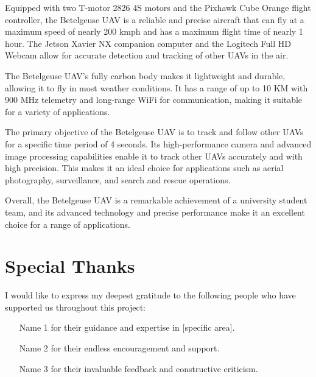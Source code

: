 \documentclass{article}
\begin{document}
Equipped with two T-motor 2826 4S motors and the Pixhawk Cube Orange flight controller, the Betelgeuse UAV is a reliable and precise aircraft that can fly at a maximum speed of nearly 200 kmph and has a maximum flight time of nearly 1 hour. The Jetson Xavier NX companion computer and the Logitech Full HD Webcam allow for accurate detection and tracking of other UAVs in the air.

The Betelgeuse UAV's fully carbon body makes it lightweight and durable, allowing it to fly in most weather conditions. It has a range of up to 10 KM with 900 MHz telemetry and long-range WiFi for communication, making it suitable for a variety of applications.

The primary objective of the Betelgeuse UAV is to track and follow other UAVs for a specific time period of 4 seconds. Its high-performance camera and advanced image processing capabilities enable it to track other UAVs accurately and with high precision. This makes it an ideal choice for applications such as aerial photography, surveillance, and search and rescue operations.

Overall, the Betelgeuse UAV is a remarkable achievement of a university student team, and its advanced technology and precise performance make it an excellent choice for a range of applications.

\section*{Special Thanks}

I would like to express my deepest gratitude to the following people who have supported us throughout this project:

\begin{itemize}
  \item [Name 1] for their guidance and expertise in [specific area].
  \item [Name 2] for their endless encouragement and support.
  \item [Name 3] for their invaluable feedback and constructive criticism.
\end{itemize}
\end{document}
